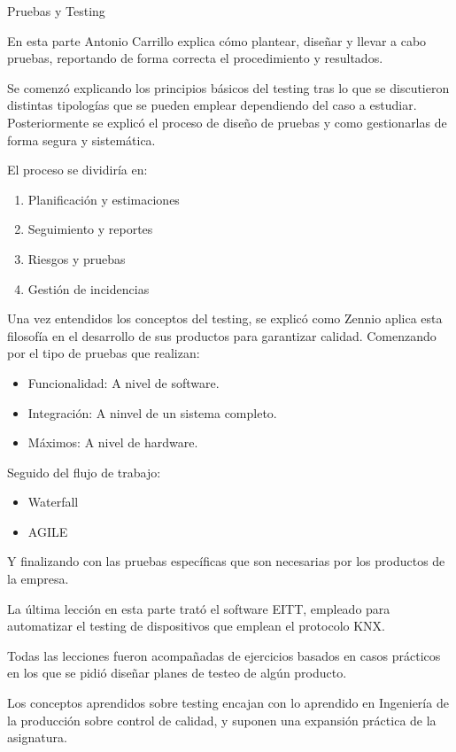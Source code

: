 \ReportSection
{Pruebas y Testing}{}
{
    En esta parte Antonio Carrillo explica cómo plantear, diseñar y llevar a cabo pruebas, reportando de forma correcta el procedimiento y resultados.
    
    Se comenzó explicando los principios básicos del testing tras lo que se discutieron distintas tipologías que se pueden emplear dependiendo del caso a estudiar. Posteriormente se explicó el proceso de diseño de pruebas y como gestionarlas de forma segura y sistemática.
    
    El proceso se dividiría en:
    \begin{enumerate}
        \item Planificación y estimaciones
        \item Seguimiento y reportes
        \item Riesgos y pruebas
        \item Gestión de incidencias
    \end{enumerate}
    
    Una vez entendidos los conceptos del testing, se explicó como Zennio aplica esta filosofía en el desarrollo de sus productos para garantizar calidad. Comenzando por el tipo de pruebas que realizan:
    
    \begin{itemize}
        \item Funcionalidad: A nivel de software.
        \item Integración: A ninvel de un sistema completo.
        \item Máximos: A nivel de hardware.
    \end{itemize}
    
    Seguido del flujo de trabajo:
    
    \begin{itemize}
        \item Waterfall
        \item AGILE
    \end{itemize}
    
    Y finalizando con las pruebas específicas que son necesarias por los productos de la empresa.
    
    La última lección en esta parte trató el software EITT, empleado para automatizar el testing de dispositivos que emplean el protocolo KNX.
    
    Todas las lecciones fueron acompañadas de ejercicios basados en casos prácticos en los que se pidió diseñar planes de testeo de algún producto.
}
{
    Los conceptos aprendidos sobre testing encajan con lo aprendido en Ingeniería de la producción sobre control de calidad, y suponen una expansión práctica de la asignatura.
}

